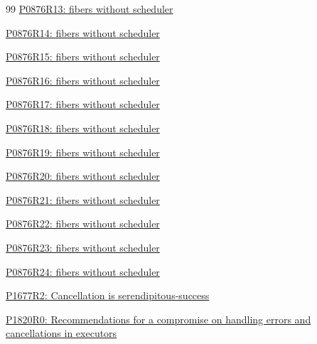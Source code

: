 \begin{thebibliography}{99}
        \href{https://www.open-std.org/jtc1/sc22/wg21/docs/papers/2023/p0876r13.pdf}
        {P0876R13: fibers without scheduler}

        \href{https://www.open-std.org/jtc1/sc22/wg21/docs/papers/2023/p0876r14.pdf}
        {P0876R14: fibers without scheduler}

        \href{https://www.open-std.org/jtc1/sc22/wg21/docs/papers/2024/p0876r15.pdf}
        {P0876R15: fibers without scheduler}

        \href{https://www.open-std.org/jtc1/sc22/wg21/docs/papers/2024/p0876r16.pdf}
        {P0876R16: fibers without scheduler}

        \href{https://www.open-std.org/jtc1/sc22/wg21/docs/papers/2024/p0876r17.pdf}
        {P0876R17: fibers without scheduler}

        \href{https://www.open-std.org/jtc1/sc22/wg21/docs/papers/2024/p0876r18.pdf}
        {P0876R18: fibers without scheduler}

        \href{https://www.open-std.org/jtc1/sc22/wg21/docs/papers/2025/p0876r19.pdf}
        {P0876R19: fibers without scheduler}

        \href{https://www.open-std.org/jtc1/sc22/wg21/docs/papers/2025/p0876r20.pdf}
        {P0876R20: fibers without scheduler}

        \href{https://www.open-std.org/jtc1/sc22/wg21/docs/papers/2025/p0876r21.pdf}
        {P0876R21: fibers without scheduler}

        \href{https://www.open-std.org/jtc1/sc22/wg21/docs/papers/2026/p0876r22.pdf}
        {P0876R22: fibers without scheduler}

        \href{https://www.open-std.org/jtc1/sc22/wg21/docs/papers/2026/p0876r23.pdf}
        {P0876R23: fibers without scheduler}

        \href{https://www.open-std.org/jtc1/sc22/wg21/docs/papers/2026/p0876r24.pdf}
        {P0876R24: fibers without scheduler}

        \href{https://www.open-std.org/jtc1/sc22/wg21/docs/papers/2019/p1677r2.pdf}
        {P1677R2: Cancellation is serendipitous-success}

        \href{https://www.open-std.org/jtc1/sc22/wg21/docs/papers/2019/p1820r0.html}
        {P1820R0: Recommendations for a compromise on handling errors and cancellations in executors}


\end{thebibliography}
